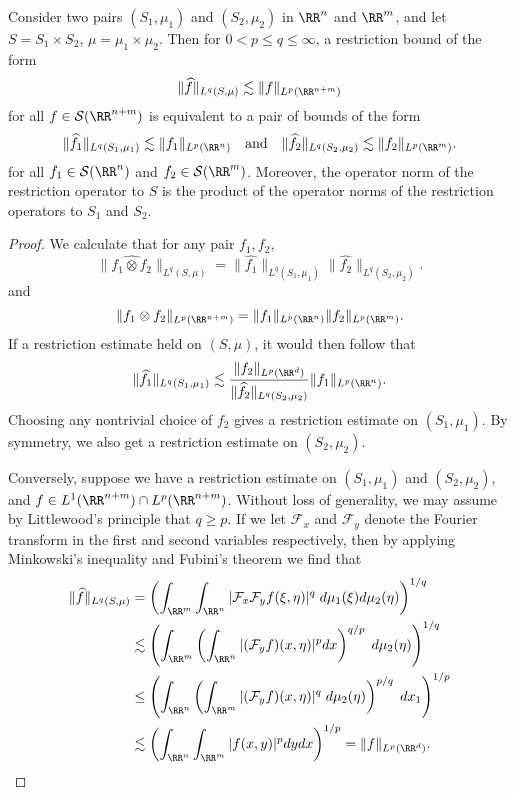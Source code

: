 \begin{theorem}
  Consider two pairs $(S_1,\mu_1)$ and $(S_2,\mu_2)$ in $\RR^n$ and $\RR^m$, and let $S = S_1 \times S_2$, $\mu = \mu_1 \times \mu_2$. Then for $0 < p \leq q \leq \infty$, a restriction bound of the form
  \[ \| \widehat{f} \|_{L^q(S,\mu)} \lesssim \| f \|_{L^p(\RR^{n+m})} \]
  for all $f \in \mathcal{S}(\RR^{n+m})$ is equivalent to a pair of bounds of the form
  \[ \| \widehat{f_1} \|_{L^q(S_1,\mu_1)} \lesssim \| f_1 \|_{L^p(\RR^n)} \quad\text{and}\quad \| \widehat{f_2} \|_{L^q(S_2,\mu_2)} \lesssim \| f_2 \|_{L^p(\RR^m)}. \]
  for all $f_1 \in \mathcal{S}(\RR^n)$ and $f_2 \in \mathcal{S}(\RR^m)$. Moreover, the operator norm of the restriction operator to $S$ is the product of the operator norms of the restriction operators to $S_1$ and $S_2$.
\end{theorem}
\begin{proof}
  We calculate that for any pair $f_1,f_2$,
  \[ \| \widehat{f_1 \otimes f_2} \|_{L^q(S,\mu)} = \| \widehat{f_1} \|_{L^q(S_1,\mu_1)} \| \widehat{f_2} \|_{L^q(S_2,\mu_2)}. \]
  and
  \[ \| f_1 \otimes f_2 \|_{L^p(\RR^{n+m})} = \| f_1 \|_{L^p(\RR^n)} \| f_2 \|_{L^p(\RR^m)}. \]
  If a restriction estimate held on $(S,\mu)$, it would then follow that
  \[ \| \widehat{f_1} \|_{L^q(S_1,\mu_1)} \lesssim \frac{\| f_2 \|_{L^p(\RR^d)}}{\| \widehat{f_2} \|_{L^q(S_2,\mu_2)}} \| f_1 \|_{L^p(\RR^n)}. \]
  Choosing any nontrivial choice of $f_2$ gives a restriction estimate on $(S_1,\mu_1)$. By symmetry, we also get a restriction estimate on $(S_2,\mu_2)$.

  Conversely, suppose we have a restriction estimate on $(S_1,\mu_1)$ and $(S_2,\mu_2)$, and $f \in L^1(\RR^{n+m}) \cap L^p(\RR^{n+m})$. Without loss of generality, we may assume by Littlewood's principle that $q \geq p$. If we let $\mathcal{F}_x$ and $\mathcal{F}_y$ denote the Fourier transform in the first and second variables respectively, then by applying Minkowski's inequality and Fubini's theorem we find that
  \begin{align*}
    \| \widehat{f} \|_{L^q(S,\mu)} &= \left( \int_{\RR^m} \int_{\RR^n} |\mathcal{F}_x \mathcal{F}_y f(\xi,\eta)|^q\; d\mu_1(\xi) d\mu_2(\eta) \right)^{1/q}\\
    &\lesssim \left( \int_{\RR^m} \left( \int_{\RR^n} |(\mathcal{F}_y f)(x,\eta)|^p dx \right)^{q/p}\; d\mu_2(\eta) \right)^{1/q}\\
    &\leq \left( \int_{\RR^n} \left( \int_{\RR^m} |(\mathcal{F}_y f)(x,\eta)|^q\; d\mu_2(\eta) \right)^{p/q}\; dx_1 \right)^{1/p}\\
    &\lesssim \left( \int_{\RR^n} \int_{\RR^m} |f(x,y)|^p dy dx \right)^{1/p} = \| f \|_{L^p(\RR^d)}. \qedhere
  \end{align*}
\end{proof}

